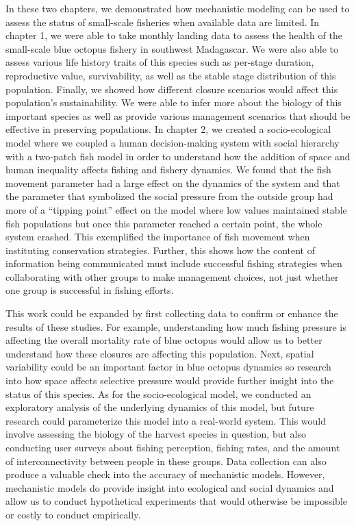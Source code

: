 \documentclass[
  12pt,
]{article}
\begin{document}
In these two chapters, we demonstrated how mechanistic modeling can be used to assess the status of small-scale fisheries when available data are limited. In chapter 1, we were able to take monthly landing data to assess the health of the small-scale blue octopus fishery in southwest Madagascar. We were also able to assess various life history traits of this species such as per-stage duration, reproductive value, survivability, as well as the stable stage distribution of this population. Finally, we showed how different closure scenarios would affect this population's sustainability. We were able to infer more about the biology of this important species as well as provide various management scenarios that should be effective in preserving populations. In chapter 2, we created a socio-ecological model where we coupled a human decision-making system with social hierarchy with a two-patch fish model in order to understand how the addition of space and human inequality affects fishing and fishery dynamics. We found that the fish movement parameter had a large effect on the dynamics of the system and that the parameter that symbolized the social pressure from the outside group had more of a ``tipping point'' effect on the model where low values maintained stable fish populations but once this parameter reached a certain point, the whole system crashed. This exemplified the importance of fish movement when instituting conservation strategies. Further, this shows how the content of information being communicated must include successful fishing strategies when collaborating with other groups to make management choices, not just whether one group is successful in fishing efforts.

This work could be expanded by first collecting data to confirm or enhance the results of these studies. For example, understanding how much fishing pressure is affecting the overall mortality rate of blue octopus would allow us to better understand how these closures are affecting this population. Next, spatial variability could be an important factor in blue octopus dynamics so research into how space affects selective pressure would provide further insight into the status of this species. As for the socio-ecological model, we conducted an exploratory analysis of the underlying dynamics of this model, but future research could parameterize this model into a real-world system. This would involve assessing the biology of the harvest species in question, but also conducting user surveys about fishing perception, fishing rates, and the amount of interconnectivity between people in these groups. Data collection can also produce a valuable check into the accuracy of mechanistic models. However, mechanistic models do provide insight into ecological and social dynamics and allow us to conduct hypothetical experiments that would otherwise be impossible or costly to conduct empirically.
\end{document}
